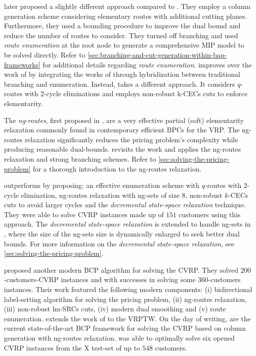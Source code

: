 \Textcite{baldacci2008} later proposed a slightly different approach compared to \textcite{fukasawa2006}.
They employ a column generation scheme considering elementary routes
with additional cutting planes.
Furthermore, they used a bounding procedure to improve the dual bound
and reduce the number of routes to consider.
They turned off branching and used \textit{route enumeration}
at the root node to generate a comprehensive MIP model to be solved directly.
Refer to \cref{sec:branching-and-cut-generation-within-bap-frameworks} for additional details
regarding \textit{route enumeration}.
\textcite{pessoa2008} improves over the work of \textcite{fukasawa2006}
by integrating the works of \textcite{fukasawa2006, baldacci2008}
through hybridization between traditional branching and enumeration.
Instead, \textcite{contardo2011} takes a different approach.
It considers $q$-routes with 2-cycle eliminations and employs non-robust k-CECs cuts
to enforce elementarity.

The \textit{ng-routes}, first proposed in \textcite{baldacci2011},
are a very effective partial (soft) elementarity relaxation
commonly found in contemporary efficient BPCs for the VRP.
The ng-routes relaxation significantly reduces the pricing problem's complexity
while producing reasonable dual-bounds.
\textcite{ropke2012} revisits the work \textcite{fukasawa2006}
and applies the ng-routes relaxation and strong branching schemes.
Refer to \cref{sec:solving-the-pricing-problem} for a thorough introduction to the ng-routes relaxation.

\Textcite{contardo2014} outperforms \textcite{contardo2011}
by proposing: an effective enumeration scheme with
$q$-routes with 2-cycle elimination, ng-routes relaxation with ng-sets of size $8$,
non-robust $k$-CECs cuts to avoid larger cycles
and the \textit{decremental state-space relaxation} technique.
They were able to solve CVRP instances made up of $151$ customers using this approach.
The \textit{decremental state-space relaxation} is extended to handle ng-sets in \textcite{martinelli2014},
where the size of the ng-sets size is dynamically enlarged to seek better dual bounds.
For more information on the \textit{decremental state-space relaxation},
see \cref{sec:solving-the-pricing-problem}.

\Textcite{pecin2017improved} proposed another modern BCP algorithm for solving the CVRP.
They solved $200$-customers-CVRP instances and with successes in solving some $360$-customers instances.
Their work featured the following modern components:
(i) bidirectional label-setting algorithm for solving the pricing problem,
(ii) ng-routes relaxation,
(iii) non-robust lm-SRCs cuts,
(iv) modern dual smoothing
and (v) route enumeration.
\Textcite{pecin2017new} extends the work of \textcite{pecin2017improved} to the VRPTW.
On the day of writing, \textcite{pessoa2018enhanced, pessoa2020generic}
are the current state-of-the-art BCP framework for solving the CVRP
based on column generation with ng-routes relaxation.
\Textcite{pessoa2020generic} was able to optimally solve six opened CVRP instances
from the X test-set \parencite{uchoa2017} of up to $548$ customers.

